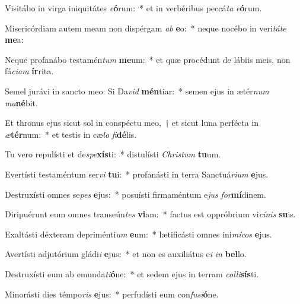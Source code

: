 \item Visitábo in virga iniquitátes \textit{e}\textbf{ó}rum:~* et in verbéribus peccá\textit{ta} \textit{e}\textbf{ó}rum.

\item Misericórdiam autem meam non dispérgam \textit{ab} \textbf{e}o:~* neque nocébo in veri\textit{tá}\textit{te} \textbf{me}a:

\item Neque profanábo testamén\textit{tum} \textbf{me}um:~* et quæ procédunt de lábiis meis, non fá\textit{ci}\textit{am} \textbf{ír}rita.

\item Semel jurávi in sancto meo: Si Da\textit{vid} \textbf{mén}tiar:~* semen ejus in ætér\textit{num} \textit{ma}\textbf{né}bit.

\item Et thronus ejus sicut sol in conspéctu meo,~† et sicut luna perfécta in \textit{æ}\textbf{tér}num:~* et testis in cæ\textit{lo} \textit{fi}\textbf{dé}lis.

\item Tu vero repulísti et de\textit{spe}\textbf{xís}ti:~* distulísti \textit{Chris}\textit{tum} \textbf{tu}um.

\item Evertísti testaméntum ser\textit{vi} \textbf{tu}i:~* profanásti in terra Sanctuá\textit{ri}\textit{um} \textbf{e}jus.

\item Destruxísti omnes se\textit{pes} \textbf{e}jus:~* posuísti firmaméntum e\textit{jus} \textit{for}\textbf{mí}dinem.

\item Diripuérunt eum omnes transeún\textit{tes} \textbf{vi}am:~* factus est oppróbrium vi\textit{cí}\textit{nis} \textbf{su}is.

\item Exaltásti déxteram depriménti\textit{um} \textbf{e}um:~* lætificásti omnes ini\textit{mí}\textit{cos} \textbf{e}jus.

\item Avertísti adjutórium gládi\textit{i} \textbf{e}jus:~* et non es auxiliátus e\textit{i} \textit{in} \textbf{bel}lo.

\item Destruxísti eum ab emunda\textit{ti}\textbf{ó}ne:~* et sedem ejus in terram \textit{col}\textit{li}\textbf{sís}ti.

\item Minorásti dies témpo\textit{ris} \textbf{e}jus:~* perfudísti eum con\textit{fu}\textit{si}\textbf{ó}ne.

